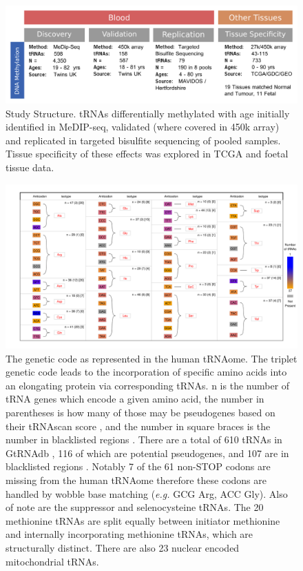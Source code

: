 \documentclass[]{book}
\begin{document}
\begin{figure}

{\centering \includegraphics[width=1\linewidth]{figs/OverviewOfAnalysesFigure_tRNA_3} 

}

\caption{Study Structure. tRNAs differentially methylated with age initially identified in MeDIP-seq, validated (where covered in 450k array) and replicated in targeted bisulfite sequencing of pooled samples. Tissue specificity of these effects was explored in TCGA and foetal tissue data.}\label{fig:OverviewOfAnalyses}
\end{figure}



\begin{figure}

{\centering \includegraphics[width=1\linewidth]{figs/kutteresq_BLcount} 

}

\caption{The genetic code as represented in the human tRNAome. The triplet genetic code leads to the incorporation of specific amino acids into an elongating protein via corresponding tRNAs. n is the number of tRNA genes which encode a given amino acid, the number in parentheses is how many of those may be pseudogenes based on their tRNAscan score \citep{Lowe2016}, and the number in square braces is the number in blacklisted regions \citep{Amemiya2019}. There are a total of 610 tRNAs in GtRNAdb \citep{Chan2009}, 116 of which are potential pseudogenes, and 107 are in blacklisted regions \citep{Amemiya2019}. Notably 7 of the 61 non-STOP codons are missing from the human tRNAome therefore these codons are handled by wobble base matching (\emph{e.g.} GCG Arg, ACC Gly). Also of note are the suppressor and selenocysteine tRNAs. The 20 methionine tRNAs are split equally between initiator methionine and internally incorporating methionine tRNAs, which are structurally distinct. There are also 23 nuclear encoded mitochondrial tRNAs.}\label{fig:kutteresq}
\end{figure}
\end{document}
